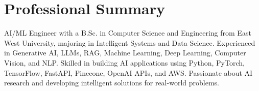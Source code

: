 \documentclass[10pt,a4paper]{article}
\begin{document}

\section*{Professional Summary}

AI/ML Engineer with a B.Sc. in Computer Science and Engineering from East West University, majoring in Intelligent Systems and Data Science. Experienced in Generative AI, LLMs, RAG, Machine Learning, Deep Learning, Computer Vision, and NLP. Skilled in building AI applications using Python, PyTorch, TensorFlow, FastAPI, Pinecone, OpenAI APIs, and AWS. Passionate about AI research and developing intelligent solutions for real-world problems.

\vspace{2mm}

\end{document}
